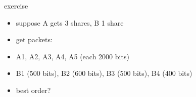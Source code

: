 \begin{frame}{exercise}
    \begin{itemize}
    \item suppose A gets 3 shares, B 1 share
    \item get packets:
    \vspace{.5cm}
    \item A1, A2, A3, A4, A5 (each 2000 bits)
    \item B1 (500 bits), B2 (600 bits), B3 (500 bits), B4 (400 bits)
    \vspace{.5cm}
    \item best order?
    \end{itemize}
\end{frame}
